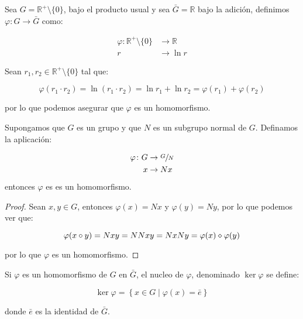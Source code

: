         \begin{ejemplo}
            Sea $G = \mathbb{R}^+ \setminus \{0\}$, bajo el producto usual y sea $\bar{G} = \mathbb{R}$ bajo la adición, definimos $\varphi \colon G \to \bar{G}$ como:

            \begin{align*}
                \varphi \colon \mathbb{R}^+ \setminus \{0\} &\to \mathbb{R} \\
                r &\to \ln{r}
            \end{align*}

            Sean $r_1, r_2 \in \mathbb{R}^+ \setminus \{0\}$ tal que:

            \begin{equation*}
                \varphi(r_1 \cdot r_2) = \ln{(r_1 \cdot r_2)} = \ln{r_1} + \ln{r_2} = \varphi(r_1) + \varphi(r_2)
            \end{equation*}

            por lo que podemos asegurar que $\varphi$ es un homomorfismo.
        \end{ejemplo}

        \begin{lema}
            Supongamos que $G$ es un grupo y que $N$ es un subgrupo normal de $G$. Definamos la aplicación:

            \begin{align*}
                \varphi \colon G &\to \sfrac{G}{N} \\
                x &\to Nx
            \end{align*}

            entonces $\varphi$ es es un homomorfismo.
        \end{lema}

        \begin{proof}
            Sean $x, y \in G$, entonces $\varphi(x) = Nx$ y $\varphi(y) = Ny$, por lo que podemos ver que:

            \begin{equation*}
                \varphi(x \circ y) = Nxy = NNxy = NxNy = \varphi(x) \diamond \varphi(y)
            \end{equation*}

            por lo que $\varphi$ es un homomorfismo.
        \end{proof}

        \begin{definicion}
            Si $\varphi$ es un homomorfismo de $G$ en $\bar{G}$, el nucleo de $\varphi$, denominado $\ker{\varphi}$ se define:

            \begin{equation}
                \ker{\varphi} = \left\{ x \in G \mid \varphi(x) = \bar{e} \right\}
            \end{equation}

            donde $\bar{e}$ es la identidad de $\bar{G}$.
        \end{definicion}

